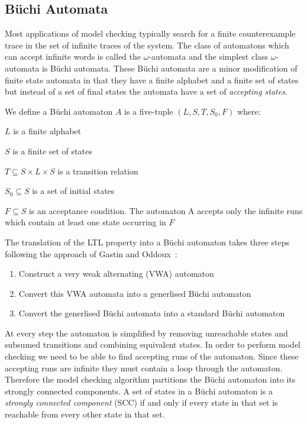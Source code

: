 \subsection{B{\"u}chi Automata}
\newcommand{\Buchi}{B{\"u}chi\xspace}
Most applications of model checking typically search for a finite counterexample trace in the set of infinite traces of the system. The class of automatons which can accept infinite words is called the $\omega$-automata and the simplest class $\omega$-automata is \Buchi automata. These \Buchi automata are a minor modification of finite state automata in that they have a finite alphabet and a finite set of states but instead of a set of final states the automata have a set of \emph{accepting states}.
\medskip
\begin{mydef}
We define a \Buchi automaton $A$ is a five-tuple $(L, S,T,S_0, F)$ where:
\item $L$ is a finite alphabet
\item $S$ is a finite set of states
\item $T \subseteq S \times L \times S$ is a transition relation
\item $S_0 \subseteq S$ is a set of initial states 
\item $F \subseteq S$ is an acceptance condition. The automaton A accepts only the infinite runs which contain at least one state occurring in $F$
\end{mydef}

The translation of the LTL property into a \Buchi automaton takes three steps following the approach of Gastin and Oddoux~\cite{PG01}:

\begin{enumerate}
\item Construct a very weak alternating (VWA) automaton
\item Convert this VWA automata into a generlised \Buchi automaton
\item Convert the generlised \Buchi automata into a standard \Buchi automaton
\end{enumerate}

At every step the automaton is simplified by removing unreachable states and subsumed transitions and combining equivalent states. In order to perform model checking we need to be able to find accepting runs of the automaton. Since these accepting runs are infinite they must contain a loop through the automaton. Therefore the model checking algorithm partitions the \Buchi automaton into its strongly connected components. A set of states in a \Buchi automaton is a \emph{strongly connected component} (SCC) if and only if every state in that set is reachable from every other state in that set. 

